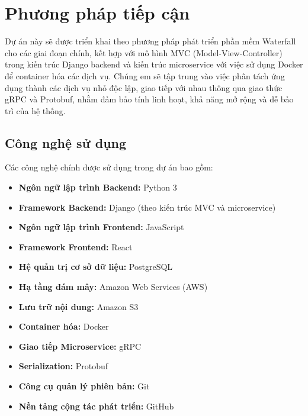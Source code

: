 \section{Phương pháp tiếp cận}
\label{sec:intro_sol}
Dự án này sẽ được triển khai theo phương pháp phát triển phần mềm Waterfall cho các giai đoạn chính, kết hợp với mô hình MVC (Model-View-Controller) trong kiến trúc Django backend và kiến trúc microservice với việc sử dụng Docker để container hóa các dịch vụ. Chúng em sẽ tập trung vào việc phân tách ứng dụng thành các dịch vụ nhỏ độc lập, giao tiếp với nhau thông qua giao thức gRPC và Protobuf, nhằm đảm bảo tính linh hoạt, khả năng mở rộng và dễ bảo trì của hệ thống.

\subsection{Công nghệ sử dụng}
\label{sec:intro_tech}
Các công nghệ chính được sử dụng trong dự án bao gồm:
\begin{itemize}
    \item \textbf{Ngôn ngữ lập trình Backend:} Python 3
    \item \textbf{Framework Backend:} Django (theo kiến trúc MVC và microservice)
    \item \textbf{Ngôn ngữ lập trình Frontend:} JavaScript
    \item \textbf{Framework Frontend:} React
    \item \textbf{Hệ quản trị cơ sở dữ liệu:} PostgreSQL
    \item \textbf{Hạ tầng đám mây:} Amazon Web Services (AWS)
    \item \textbf{Lưu trữ nội dung:} Amazon S3
    \item \textbf{Container hóa:} Docker
    \item \textbf{Giao tiếp Microservice:} gRPC
    \item \textbf{Serialization:} Protobuf
    \item \textbf{Công cụ quản lý phiên bản:} Git
    \item \textbf{Nền tảng cộng tác phát triển:} GitHub
\end{itemize}


